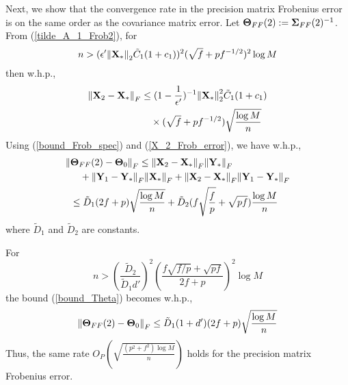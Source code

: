 \begin{IEEEproof}
Next, we show that the convergence rate in the precision matrix Frobenius error is on the same order as the covariance matrix error. Let ${\mathbf{\Theta}}_{FF}(2):={\mathbf{\Sigma}}_{FF}(2)^{-1}$. From (\ref{tilde_A_1_Frob2}), for
\begin{equation*}
	n> (\epsilon' { \parallel }{\mathbf{X}}_*{ \parallel }_2 \tilde{C}_1 (1+c_1))^2 (\sqrt{f}+pf^{-1/2})^2 \log M
\end{equation*}
then w.h.p.,
\begin{align}
	{ \parallel } {\mathbf{X}}_2-{\mathbf{X}}_*{ \parallel }_F &\leq (1-\frac{1}{\epsilon'})^{-1} { \parallel }{\mathbf{X}}_*{ \parallel }_2^2 \tilde{C}_1(1+c_1) \nonumber \\
		&\quad \times (\sqrt{f}+pf^{-1/2}) \sqrt{\frac{\log M}{n}} \label{X_2_Frob_error}
\end{align}
Using (\ref{bound_Frob_spec}) and (\ref{X_2_Frob_error}), we have w.h.p.,
\begin{align}
	{ \parallel } & {\mathbf{\Theta}}_{FF}(2)-{\mathbf{\Theta}}_0 { \parallel }_F \leq { \parallel } {\mathbf{X}}_2-{\mathbf{X}}_*{ \parallel }_F { \parallel } {\mathbf{Y}}_*{ \parallel }_F \nonumber \\
		&\quad + { \parallel } {\mathbf{Y}}_1-{\mathbf{Y}}_*{ \parallel }_F { \parallel } {\mathbf{X}}_*{ \parallel }_F + { \parallel } {\mathbf{X}}_2-{\mathbf{X}}_*{ \parallel }_F { \parallel } {\mathbf{Y}}_1-{\mathbf{Y}}_*{ \parallel }_F \nonumber \\
		&\leq \tilde{D}_1 (2f+p) \sqrt{\frac{\log M}{n}} + \tilde{D}_2 (f\sqrt{\frac{f}{p}}+\sqrt{pf}) \frac{\log M}{n} \label{bound_Theta}
\end{align}
where $\tilde{D}_1$ and $\tilde{D}_2$ are constants.

For
\begin{equation*}
	n>(\frac{\tilde{D}_2}{\tilde{D}_1 d'})^2 (\frac{f\sqrt{f/p}+\sqrt{pf}}{2f+p})^2 \log M
\end{equation*}
the bound (\ref{bound_Theta}) becomes w.h.p.,
\begin{equation*}
	{ \parallel } {\mathbf{\Theta}}_{FF}(2)-{\mathbf{\Theta}}_0 { \parallel }_F \leq \tilde{D}_1 (1+d') (2f+p) \sqrt{\frac{\log M}{n}}
\end{equation*}
Thus, the same rate $O_P\left( \sqrt{\frac{(p^2+f^2)\log M}{n}} \right)$ holds for the precision matrix Frobenius error.




\end{IEEEproof}
